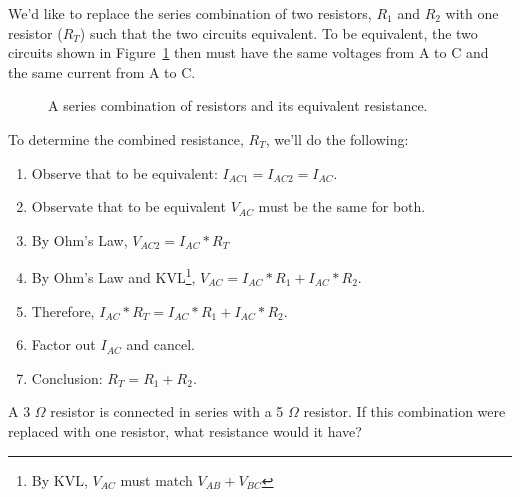 We'd like to replace the series combination of two resistors, $R_1$ and $R_2$ with one resistor ($R_T$) such that the two circuits equivalent. To be equivalent, the two circuits shown in Figure~\ref{F:2SER} then must have the same voltages from A to C and the same current from A to C.

\begin{figure}[H]
\begin{center}
\caption{A series combination of resistors and its equivalent resistance.}
\label{F:2SER}
\end{center}
\end{figure}

To determine the combined resistance, $R_T$, we'll do the following:
\begin{enumerate}
\item Observe that to be equivalent: $I_{AC1}=I_{AC2}=I_{AC}$.
\item Observate that to be equivalent $V_{AC}$ must be the same for both.
\item By Ohm's Law, $V_{AC2}=I_{AC}*R_T$
\item By Ohm's Law and KVL\footnote{By KVL, $V_{AC}$ must match $V_{AB}+V_{BC}$}, $V_{AC}=I_{AC}*R_1+I_{AC}*R_2$.
\item Therefore, $I_{AC}*R_T=I_{AC}*R_1+I_{AC}*R_2$.
\item Factor out $I_{AC}$ and cancel. 
\item Conclusion: $R_T=R_1+R_2$.
\end{enumerate}

\begin{alevel}
A 3 $\Omega$ resistor is connected in series with a 5 $\Omega$ resistor. If this combination were replaced with one resistor, what resistance would it have?
\end{alevel}

